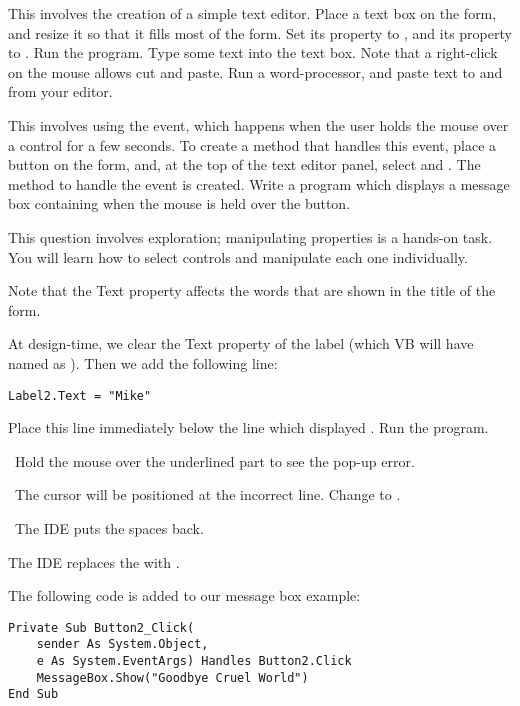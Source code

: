 \begin{enumChapter}
			\item	This involves the creation of a simple text editor. Place a text box on the form, and resize it so that it fills most of the form. Set its  property to , and its  property to . Run the program. Type some text into the text box. Note that a right-click on the mouse allows cut and paste. Run a word-processor, and paste text to and from your editor.
			\item	This involves using the  event, which happens when the user holds the mouse over a control for a few seconds. To create a method that handles this event, place a button on the form, and, at the top of the text editor panel, select  and . The method to handle the event is created. Write a program which displays a message box containing  when the mouse is held over the button.
		\end{enumChapter}

		\begin{stab}
			\begin{enumChapter}
				\item	This question involves exploration; manipulating properties is a hands-on task. You will learn how to select controls and manipulate each one individually.
				\item	Note that the Text property affects the words that are shown in the title of the form.
				\item	At design-time, we clear the Text property of the label (which VB will have named as ). Then we add the following line:
					\begin{lstlisting}
Label2.Text = "Mike"
					\end{lstlisting}
				Place this line immediately below the line which displayed . Run the program.
				\item	
					\begin{enumAlph}
						\item Hold the mouse over the underlined part to see the pop-up error.
						\item The cursor will be positioned at the incorrect line. Change  to .
						\item The IDE puts the spaces back.
						\item The IDE replaces the  with .
					\end{enumAlph}
				\item	The following code is added to our message box example:
					\begin{lstlisting}
Private Sub Button2_Click( 
	sender As System.Object,
	e As System.EventArgs) Handles Button2.Click
	MessageBox.Show("Goodbye Cruel World")
End Sub
					\end{lstlisting}

			\end{enumChapter}
		\end{stab}
